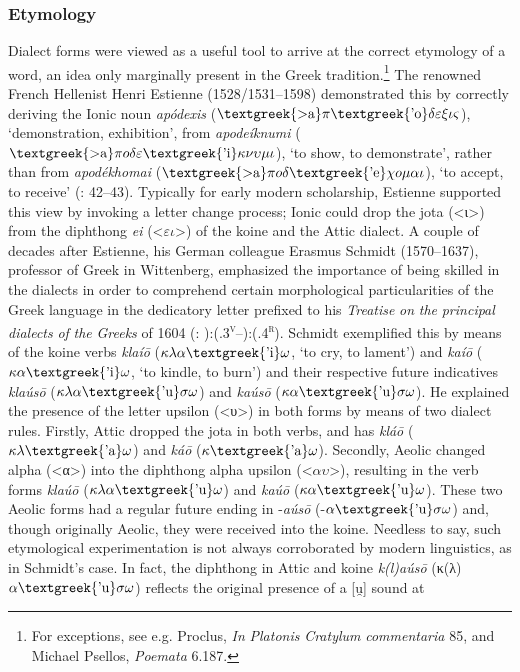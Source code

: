 \documentclass[output=paper]{langsci/langscibook}
\begin{document}
\subsubsection{Etymology}
\hypertarget{Toc19704821}{}
Dialect forms were viewed as a useful tool to arrive at the correct etymology of a word, an idea only marginally present in the Greek tradition.\footnote{For exceptions, see e.g. Proclus, \textit{In} \textit{Platonis} \textit{Cratylum} \textit{commentaria} 85, and Michael Psellos, \textit{Poemata} 6.187.} The renowned French Hellenist Henri Estienne (1528/1531–1598) demonstrated this by correctly deriving the Ionic noun \textit{apódexis} ($\text{\textgreek{>a}}\pi \text{\textgreek{'o}}\delta \varepsilon \xi \iota \varsigma $), ‘demonstration, exhibition’, from \textit{apodeíknumi} ($\text{\textgreek{>a}}\pi o\delta \varepsilon \text{\textgreek{'i}}\kappa \nu \upsilon \mu \iota $), ‘to show, to demonstrate’, rather than from \textit{apodékhomai} ($\text{\textgreek{>a}}\pi o\delta \text{\textgreek{'e}}\chi o\mu \alpha \iota $), ‘to accept, to receive’ (\citealt{Estienne1581}: 42–43). Typically for early modern scholarship, Estienne supported this view by invoking a letter change process; Ionic could drop the jota (<ι>) from the diphthong \textit{ei} (<$\varepsilon \iota $>) of the koine and the Attic dialect. A couple of decades after Estienne, his German colleague Erasmus Schmidt (1570–1637), professor of Greek in Wittenberg, emphasized the importance of being skilled in the dialects in order to comprehend certain morphological particularities of the Greek language in the dedicatory letter prefixed to his \textit{Treatise} \textit{on} \textit{the} \textit{principal} \textit{dialects} \textit{of} \textit{the} \textit{Greeks} of 1604 (\citealt{Schmidt1604}: ):(.3\textsc{\textsuperscript{v}}–):(.4\textsc{\textsuperscript{r}}). Schmidt exemplified this by means of the koine verbs \textit{klaíō} ($\kappa \lambda \alpha \text{\textgreek{'i}}\omega $, ‘to cry, to lament’) and \textit{kaíō} ($\kappa \alpha \text{\textgreek{'i}}\omega $, ‘to kindle, to burn’) and their respective future indicatives \textit{klaúsō} ($\kappa \lambda \alpha \text{\textgreek{'u}}\sigma \omega $) and \textit{kaúsō} ($\kappa \alpha \text{\textgreek{'u}}\sigma \omega $). He explained the presence of the letter upsilon (<υ>) in both forms by means of two dialect rules. Firstly, Attic dropped the jota in both verbs, and has \textit{kláō} ($\kappa \lambda \text{\textgreek{'a}}\omega $) and \textit{káō} ($\kappa \text{\textgreek{'a}}\omega $). Secondly, Aeolic changed alpha (<α>) into the diphthong alpha upsilon (<$\alpha \upsilon $>), resulting in the verb forms \textit{klaúō} ($\kappa \lambda \alpha \text{\textgreek{'u}}\omega $) and \textit{kaúō} ($\kappa \alpha \text{\textgreek{'u}}\omega $). These two Aeolic forms had a regular future ending in -\textit{aúsō} (-$\alpha \text{\textgreek{'u}}\sigma \omega $) and, though originally Aeolic, they were received into the koine. Needless to say, such etymological experimentation is not always corroborated by modern linguistics, as in Schmidt’s case.\textstyleFootnoteSymbol{} In fact, the diphthong in Attic and koine \textit{k(l)aúsō} (κ(λ)$\alpha \text{\textgreek{'u}}\sigma \omega $) reflects the original presence of a [u̯] sound at 
\end{document}
